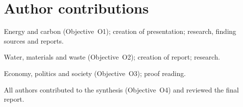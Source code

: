\section*{Author contributions}
{\footnotesize
\begin{description}[leftmargin=0pt,labelsep=0.4em,itemsep=3pt]
\item[Aditya Kumar:] Energy and carbon (Objective~O1); creation of presentation; research, finding sources and reports.
\item[Aryan Solanki:] Water, materials and waste (Objective~O2); creation of report; research.
\item[Prerna Sawane:] Economy, politics and society (Objective~O3); proof reading.
\end{description}
\par\medskip\noindent
All authors contributed to the synthesis (Objective~O4) and reviewed the final report.\par}
